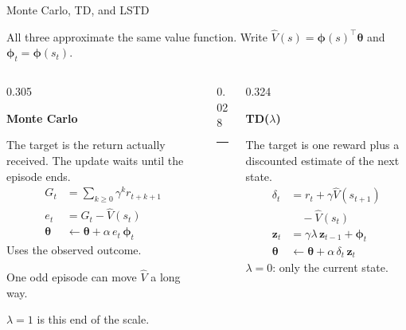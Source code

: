 \documentclass[aspectratio=169,11pt]{beamer}
\newcommand{\memberA}{Member A}
\newcommand{\speaker}[1]{} %
\newcommand{\vphi}{\bm{\phi}}
\newcommand{\vz}{\mathbf{z}}
\newcommand{\vth}{\bm{\theta}}
\begin{document}
\begin{frame}{Monte Carlo, TD, and LSTD}
  \speaker{\memberA}
  \scriptsize
  All three approximate the same value function. Write $\hat V(s)=\vphi(s)^\top\vth$ and $\vphi_t=\vphi(s_t)$.
  \vspace{0.2em}
  \setlength{\abovedisplayskip}{3pt}%
  \setlength{\belowdisplayskip}{3pt}%
  \begin{columns}[T,onlytextwidth]
    \begin{column}{0.305\textwidth}
      \begin{minipage}[t][4.35cm][t]{0.94\linewidth}
      \raggedright
      {\color{accent}\small\bfseries Monte Carlo}\par\vspace{0.28em}
      The target is the return actually received. The update waits until the episode ends.
      \begin{align*}
        G_t &= \textstyle\sum_{k\ge 0}\gamma^k r_{t+k+1}\\
        e_t &= G_t-\hat V(s_t)\\
        \vth &\leftarrow \vth+\alpha\,e_t\,\vphi_t
      \end{align*}
      Uses the observed outcome.\par
      One odd episode can move $\hat V$ a long way.\par
      $\lambda=1$ is this end of the scale.
      \end{minipage}
    \end{column}
    \begin{column}{0.028\textwidth}
      \centering\textcolor{hair}{\rule{0.7pt}{4.35cm}}
    \end{column}
    \begin{column}{0.324\textwidth}
      \begin{minipage}[t][4.35cm][t]{0.94\linewidth}
      \raggedright
      {\color{accent}\small\bfseries TD($\lambda$)}\par\vspace{0.28em}
      The target is one reward plus a discounted estimate of the next state.
      \begin{align*}
        \delta_t &= r_t+\gamma\hat V(s_{t+1})\\
                 &\quad {}-\hat V(s_t)\\
        \vz_t &= \gamma\lambda\,\vz_{t-1}+\vphi_t\\
        \vth &\leftarrow \vth+\alpha\,\delta_t\,\vz_t
      \end{align*}
      $\lambda=0$: only the current state.\par

\end{minipage}
\end{column}
\end{columns}
\end{frame}
\end{document}
